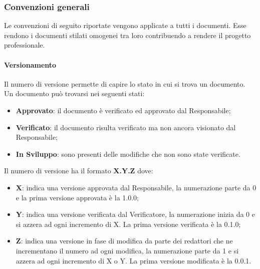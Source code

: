 \subsubsection{Convenzioni generali}
Le convenzioni di seguito riportate vengono applicate a tutti i documenti.
Esse rendono i documenti stilati omogenei tra loro contribuendo a rendere il progetto professionale.

\paragraph{Versionamento}
Il numero di versione permette di capire lo stato in cui si trova un documento.
Un documento può trovarsi nei seguenti stati:
\begin{itemize} 
    \item \textbf{Approvato}: il documento è verificato ed approvato dal Responsabile;
    \item \textbf{Verificato}: il documento risulta verificato ma non ancora visionato dal Responsabile;
    \item \textbf{In Sviluppo}: sono presenti delle modifiche che non sono state verificate.
\end{itemize}
Il numero di versione ha il formato \textbf{X.Y.Z} dove:
\begin{itemize} 
    \item \textbf{X}: indica una versione approvata dal Responsabile, la numerazione parte da 0
    e la prima versione approvata è la 1.0.0;
    \item \textbf{Y}: indica una versione verificata dal Verificatore, la numerazione inizia da 0 e si azzera ad ogni incremento di X. La prima versione
    verificata è la 0.1.0;
    \item \textbf{Z}: indica una versione in fase di modifica da parte dei redattori che ne incrementano il numero ad ogni modifica,
    la numerazione parte da 1 e si azzera ad ogni incremento di X o Y. La prima versione modificata è la 0.0.1.
\end{itemize}

